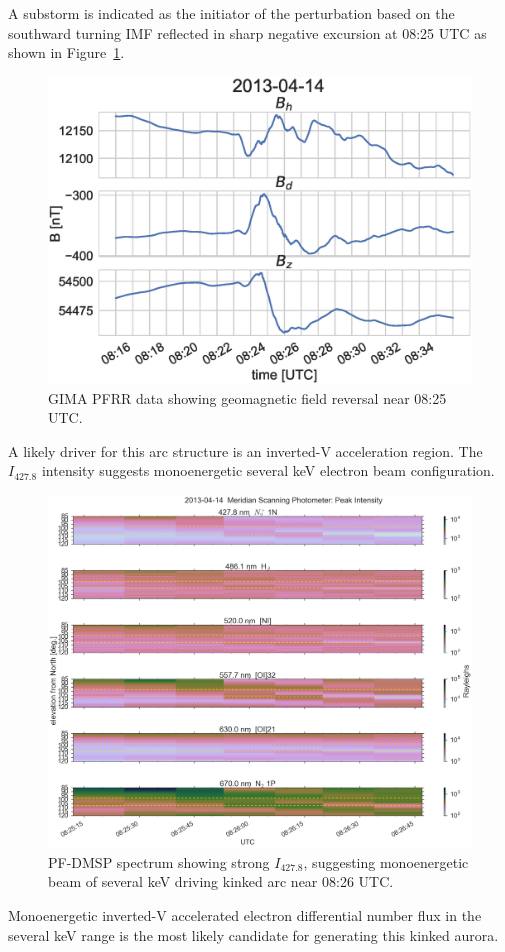 A substorm is indicated as the initiator of the perturbation based on the southward turning IMF reflected in sharp negative excursion at 08:25 UTC as shown in Figure~\ref{fig:mag0826}.
\begin{figure}\centering
    \includegraphics[width=\columnwidth]{gfx/2013-04-14T0826/mag}
    \caption{GIMA PFRR data showing geomagnetic field reversal near 08:25 UTC.}
    \label{fig:mag0826}
\end{figure}
A likely driver for this arc structure is an inverted-V acceleration region.
The $I_{427.8}$ intensity suggests monoenergetic several keV electron beam configuration.
\begin{figure}
    \includegraphics[width=\columnwidth]{gfx/2013-04-14T0826/msp_spectra}
    \caption{PF-DMSP spectrum showing strong $I_{427.8}$, suggesting monoenergetic beam of several keV driving kinked arc near 08:26 UTC.}\label{fig:msp0826}
\end{figure}
Monoenergetic inverted-V accelerated electron differential number flux in the several keV range is the most likely candidate for generating this kinked aurora.